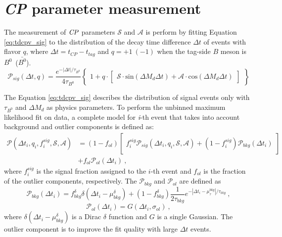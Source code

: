 \chapter{\textit{CP} parameter measurement}

The measurement of $\it{CP}$ parameters $\mathcal{S}$ and $\mathcal{A}$ is perform by fitting  Equation \ref{eq:tdcpv_sig} to the distribution of the decay time difference $\Delta t$ of events with flavor $q$, where $\Delta t = t_{CP}-t_{tag}$ and $q =  +1~(-1)$ when the tag-side $B$ meson is $B^0$~($\bar{B^0}$). 
\begin{equation}\label{eq:tdcpv_sig}
\mathcal{P}_{sig}(\Delta t, q ) = 
\frac{e^{-|\Delta t|/\tau_{B^0}}}{4\tau_{B^0}}
\begin{Bmatrix}
1 + q \cdot 
\begin{bmatrix}
\mathcal{S}\cdot\text{sin}(\Delta M_d \Delta t) + 
\mathcal{A}\cdot\text{cos}(\Delta M_d \Delta t)
\end{bmatrix}
\end{Bmatrix}
\end{equation}

The Equation \ref{eq:tdcpv_sig} describes the distribution of signal events only with $\tau_{B^0}$ and $\Delta M_d$ as physics parameters. To perform the unbinned maximum likelihood fit on data, a complete model for \textit{i}-th event that takes into account background and outlier components is defined as:
\begin{equation}\label{eq:tdcpv_all}
\begin{split}
\mathcal{P}(\Delta t_i,q_i,f^{sig}_i,\mathcal{S},\mathcal{A})
&=(1-f_{ol})\begin{bmatrix}f^{sig}_i\mathcal{P}_{sig}(\Delta t_i,q_i,\mathcal{S},\mathcal{A})+(1-f^{sig}_i)\mathcal{P}_{bkg}(\Delta t_i)
\end{bmatrix}\\
&+f_{ol}\mathcal{P}_{ol}(\Delta t_i)~,
\end{split}
\end{equation}
where $f^{sig}_i$ is the signal fraction assigned to the $i$-th event and $f_{ol}$ is the fraction of the outlier components, respectively. The $\mathcal{P}_{bkg}$ and $\mathcal{P}_{ol}$ are defined as
\begin{equation}\label{eq:p_bkg}
\mathcal{P}_{bkg} (\Delta t_i)=
f_{bkg}^{\delta}\delta(\Delta t_i-\mu_{bkg}^{\delta})+(1-f_{bkg}^{\delta})
\frac{1}{2\tau_{bkg}}e^{-|\Delta t_i-\mu_{\tau}^{bkg}|/\tau_{bkg}}~,
\end{equation}
\begin{equation}\label{eq:p_out}
\mathcal{P}_{ol} (\Delta t_i)=
G(\Delta t_i, \sigma_{ol})~,
\end{equation}
where $\delta(\Delta t_i-\mu_{bkg}^{\delta})$ is a Dirac $\delta$ function and $G$ is a single Gaussian. The outlier component is to improve the fit quality with large $\Delta t$ events. 

